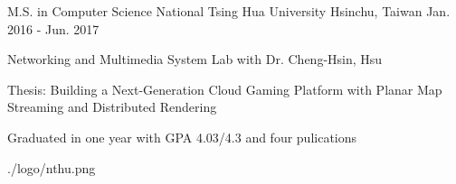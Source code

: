 

\begin{cventries}

  \cventry
    {M.S. in Computer Science} %
    {National Tsing Hua University} %
    {Hsinchu, Taiwan} %
    {Jan. 2016 - Jun. 2017} %
    {
      \begin{cvitems} %
        \item {Networking and Multimedia System Lab with Dr. Cheng-Hsin, Hsu}
        \item {Thesis: Building a Next-Generation Cloud Gaming Platform with Planar Map Streaming and Distributed Rendering}
        \item {Graduated in one year with GPA 4.03/4.3 and four pulications}
      \end{cvitems}
    }
    {./logo/nthu.png} %

\end{cventries}
